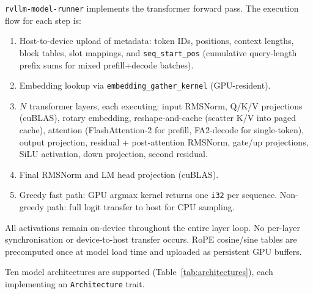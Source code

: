 \texttt{rvllm-model-runner} implements the transformer forward pass. The execution
flow for each step is:
\begin{enumerate}
  \item Host-to-device upload of metadata: token IDs, positions, context lengths,
        block tables, slot mappings, and \texttt{seq\_start\_pos} (cumulative
        query-length prefix sums for mixed prefill+decode batches).
  \item Embedding lookup via \texttt{embedding\_gather\_kernel} (GPU-resident).
  \item $N$ transformer layers, each executing: input RMSNorm, Q/K/V projections
        (cuBLAS), rotary embedding, reshape-and-cache (scatter K/V into paged cache),
        attention (FlashAttention-2 for prefill, FA2-decode for single-token), output
        projection, residual + post-attention RMSNorm, gate/up projections,
        SiLU activation, down projection, second residual.
  \item Final RMSNorm and LM head projection (cuBLAS).
  \item Greedy fast path: GPU argmax kernel returns one \texttt{i32} per sequence.
        Non-greedy path: full logit transfer to host for CPU sampling.
\end{enumerate}

All activations remain on-device throughout the entire layer loop. No per-layer
synchronisation or device-to-host transfer occurs. RoPE cosine/sine tables are
precomputed once at model load time and uploaded as persistent GPU buffers.

Ten model architectures are supported (Table~\ref{tab:architectures}), each
implementing an \texttt{Architecture} trait.

